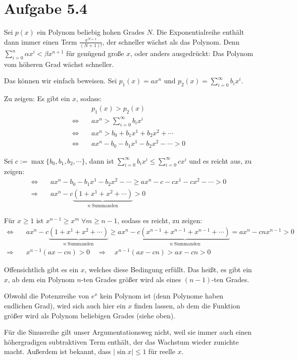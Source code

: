 \documentclass[a4paper,german,12pt,smallheadings]{scrartcl}
\begin{document}
\section*{Aufgabe 5.4}

Sei $p(x)$ ein Polynom beliebig hohen Grades $N$. Die Exponentialreihe enthält
dann immer einen Term $\frac{x^{N+1}}{(N+1)!}$, der schneller wächst als das
Polynom. Denn $\sum_{i=0}^n \alpha x^i < \beta x^{n+1}$ für genügend große $x$,
oder anders ausgedrückt: Das Polynom vom höheren Grad wächst schneller.

Das können wir einfach beweisen. Sei $p_1(x)=ax^n$ und $p_2(x)=\sum\limits_{i=0}^{\infty} b_i x^i$.

Zu zeigen: Es gibt ein $x$, sodass:
\begin{align*}
  &p_1(x)>p_2(x)\\
  \Leftrightarrow\quad& ax^n>\sum\limits_{i=0}^{\infty} b_i x^i\\
  \Leftrightarrow\quad& ax^n>b_0+b_1x^1+b_2x^2+ \cdots\\
  \Leftrightarrow\quad& ax^n-b_0-b_1x^1-b_2x^2- \cdots >0
\end{align*}

Sei $c:=\max\{b_0,b_1,b_2,\cdots\}$, dann ist $\sum\limits_{i=0}^{\infty} b_i x^i \leq \sum\limits_{i=0}^{\infty} c x^i$ und es reicht aus, zu zeigen:
\begin{align*}
  \Leftrightarrow\quad& ax^n-b_0-b_1x^1-b_2x^2- \cdots \geq ax^n-c-cx^1-cx^2- \cdots>0\\
  \Rightarrow\quad& ax^n-c\underbrace{\left(1+x^1+x^2+\cdots \right)}_{n\;\text{Summanden}}>0
\end{align*}

Für $x \geq 1$ ist $x^{n-1} \geq x^m \; \forall m \geq n-1$, sodass es reicht, zu zeigen:
\begin{align*}
  \Leftrightarrow\quad & ax^n-c\underbrace{\left(1+x^1+x^2+\cdots \right)}_{n\;\text{Summanden}} \geq ax^n-c\underbrace{\left(x^{n-1}+x^{n-1}+x^{n-1}+\cdots \right)}_{n\;\text{Summanden}} = ax^n-cnx^{n-1} > 0\\
  \Rightarrow\quad& x^{n-1}\left(ax-cn\right)>0 \quad \Rightarrow \quad x^{n-1}\left(ax-cn\right)>ax-cn>0
\end{align*}

Offensichtlich gibt es ein $x$, welches diese Bedingung erfüllt. Das heißt, es
gibt ein $x$, ab dem ein Polynom $n$-ten Grades größer wird als eines $(n-1)$-ten
Grades.

Obwohl die Potenzreihe von $e^x$ kein Polynom ist (denn Polynome haben
endlichen Grad), wird sich auch hier ein $x$ finden lassen, ab dem die Funktion
größer wird als Polynom beliebigen Grades (siehe oben).

Für die Sinusreihe gilt unser Argumentationsweg nicht, weil sie immer auch einen
höhergradigen subtraktiven Term enthält, der das Wachstum wieder zunichte macht.
Außerdem ist bekannt, dass $|\sin x| \le 1$ für reelle $x$.
\end{document}
